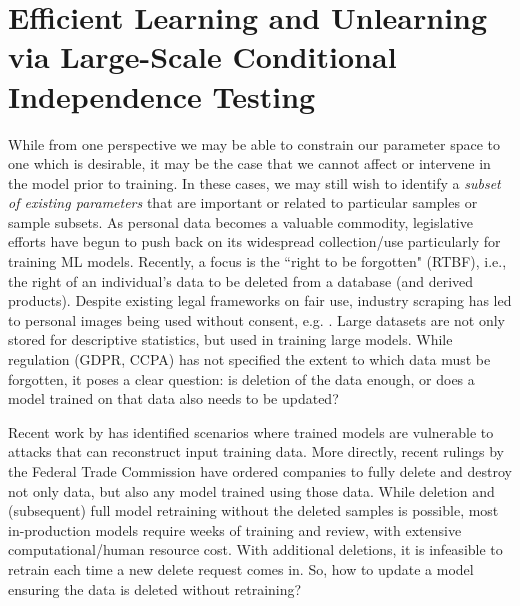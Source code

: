 \chapter{Efficient Learning and Unlearning via Large-Scale Conditional Independence Testing} \label{chap:lcodec} 

While from one perspective we may be able to constrain our parameter space to one which is desirable,
it may be the case that we cannot
affect or intervene in the model prior to training.
In these cases, 
we may still wish to identify a \textit{subset of existing parameters} that are important or related to particular samples or sample subsets.
As personal data becomes a valuable commodity, legislative efforts have begun to push back on its widespread collection/use particularly for training ML models. Recently, a focus is the ``right to be forgotten" (RTBF), i.e., the right of an individual's data to be deleted from a database (and derived products).
Despite existing legal frameworks on fair use, industry scraping has led to personal images being used without consent, e.g. \cite{Exposing}.
Large datasets are not only stored for descriptive statistics, but used in training large models.
While regulation (GDPR, CCPA) has not specified the extent to which data must be forgotten, it poses a clear question: is  deletion of the data enough, or does a model trained on that data also needs to be updated?

Recent work by \cite{carlini2019secret,carlini2020attack} has identified scenarios where trained models are vulnerable to attacks that can reconstruct input training data. More directly, recent rulings by the Federal Trade Commission \cite{ftc,ftc2} have ordered companies to fully delete and destroy not only data, but also any model trained using those data.
While deletion and (subsequent) full model retraining without the deleted samples is possible, most in-production models require weeks of 
training and review, with extensive computational/human resource cost. With additional deletions, it is infeasible to retrain each time a new delete request comes in. 
So, how to update a model ensuring the data is deleted without retraining?

